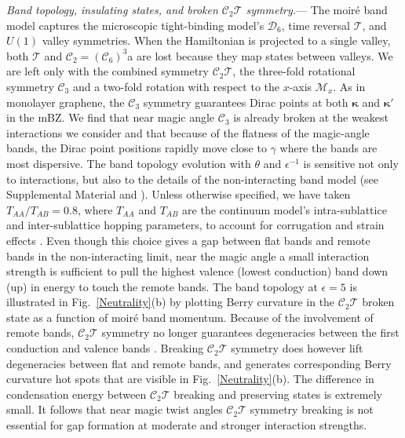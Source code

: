 \documentclass[aps,prl,reprint,amssymb,groupedaddress,twocolumn]{revtex4}
\newcommand{\CT}{$\mathcal{C}_2\mathcal{T}$ }
\newcommand{\CTs}{$\mathcal{C}_2\mathcal{T}$}
\begin{document}
{\em Band topology, insulating states, and broken \CT symmetry.}---\noindent
The moir\'e band model \cite{BMModel} captures the 
microscopic tight-binding model's $\mathcal{D}_6$,  
time reversal $\mathcal{T}$, and $U(1)$ valley symmetries. 
When the Hamiltonian is projected to a single valley, 
both $\mathcal{T}$ and $\mathcal{C}_2=(\mathcal{C}_6)^3$a are lost because they map states between valleys.
We are left only with the combined symmetry \CTs,
the three-fold rotational symmetry $\mathcal{C}_3$ and a
two-fold rotation with respect to the $x$-axis $\mathcal{M}_x$.
As in monolayer graphene, the $\mathcal{C}_3$ symmetry guarantees 
Dirac points at both $\bm{\kappa}$ and $\bm{\kappa'}$
in the mBZ.  We find that near magic angle $\mathcal{C}_3$ is already broken
at the weakest interactions we consider and that
because of the flatness of the magic-angle bands, the Dirac point positions rapidly move close to
$\gamma$ where the bands are most dispersive. 
The band topology evolution with $\theta$ and $\epsilon^{-1}$ is 
sensitive not only to interactions, but also to the details of the non-interacting band model (see Supplemental Material and \cite{XieMacDonald}).
Unless otherwise specified, we have taken $T_{AA}/T_{AB}=0.8$, where $T_{AA}$ and $T_{AB}$ are the continuum model's 
intra-sublattice and inter-sublattice hopping parameters, to account
for corrugation and strain effects \cite{Kaxiras}.
Even though this choice gives 
a gap between flat bands and remote bands in the non-interacting 
limit, near the magic angle a small interaction strength is sufficient to pull
the highest valence (lowest conduction) band down (up)
in energy to touch the remote bands. 
The band topology at $\epsilon=5$ is illustrated in 
Fig.~\ref{Neutrality}(b) by plotting Berry curvature in the 
\CT broken state as a function of moir\'e band momentum.
Because of the involvement of remote bands, \CT symmetry no longer
guarantees degeneracies between the first conduction and valence bands
\cite{VishwanathWannierObstructions,VishwanathMarch}.
Breaking \CT symmetry does however lift degeneracies between flat and remote bands,
and generates corresponding Berry curvature hot spots that are visible in Fig.~\ref{Neutrality}(b).
The difference in condensation energy between \CT breaking and preserving states is extremely small.
It follows that near magic twist angles \CT symmetry breaking is 
not essential for gap formation at moderate and stronger interaction strengths. 
\end{document}
